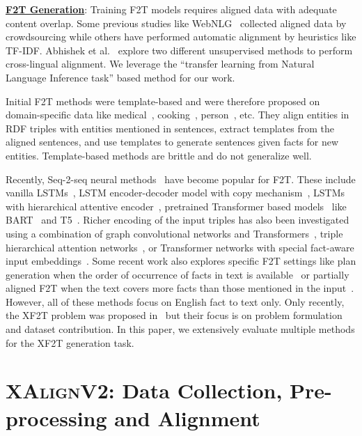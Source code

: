 \documentclass[runningheads]{llncs}
\newcommand{\data}{\textsc{XAlignV2}}
\begin{document}
\noindent\underline{\textbf{F2T Generation}}:
Training F2T models requires aligned data with adequate content overlap. Some previous studies like WebNLG~\cite{gardent2017webnlg} collected aligned data by crowdsourcing while others have performed automatic alignment by heuristics like TF-IDF. Abhishek et al.~\cite{abhishek2022xalign} explore two different unsupervised methods to perform cross-lingual alignment. We leverage the ``transfer learning from Natural Language Inference task'' based method for our work.

Initial F2T methods were template-based and were therefore proposed on domain-specific data like medical~\cite{bontcheva2004automatic}, cooking~\cite{cimiano2013exploiting}, person~\cite{duma2013generating}, etc. They align entities in RDF triples with entities mentioned in sentences, extract templates from the aligned sentences, and use templates to generate sentences given facts for new entities. Template-based methods are brittle and do not generalize well.

Recently, Seq-2-seq neural methods~\cite{lebret2016wikibio,mei2016talk} have become popular for F2T. These include vanilla LSTMs~\cite{vougiouklis2018neural}, LSTM encoder-decoder model with copy mechanism~\cite{shahidi2020two}, LSTMs with hierarchical attentive encoder~\cite{nema2018generating}, pretrained Transformer based models~\cite{ribeiro2021investigating} like BART~\cite{lewis2020bart} and T5~\cite{raffel2020exploring}.
Richer encoding of the input triples has also been investigated using a combination of graph convolutional networks and Transformers~\cite{zhao2020bridging}, triple hierarchical attention networks~\cite{chen2020kgpt}, or Transformer networks with special fact-aware input embeddings~\cite{chen2020kgpt}. Some recent work also explores specific F2T settings like plan generation when the order of occurrence of facts in text is available~\cite{zhao2020bridging} or partially aligned F2T when the text covers more facts than those mentioned in the input~\cite{fu2020partially}. However, all of these methods focus on English fact to text only. Only recently, the XF2T problem was proposed in~\cite{abhishek2022xalign} but their focus is on problem formulation and dataset contribution. In this paper, we extensively evaluate multiple methods for the XF2T generation task. 

\section{\data{}: Data Collection, Pre-processing and Alignment}
\label{sec:dataCreation}
\end{document}
